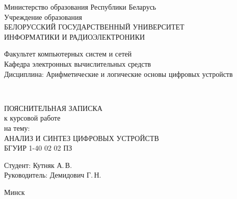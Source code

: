 \begin{titlepage}
    \begin{center}
      Министерство образования Республики Беларусь\\[1em]
      Учреждение образования\\
      БЕЛОРУССКИЙ ГОСУДАРСТВЕННЫЙ УНИВЕРСИТЕТ\\
      ИНФОРМАТИКИ И РАДИОЭЛЕКТРОНИКИ\\[2em]
  
      \begin{minipage}{\textwidth}
        \begin{flushleft}
          Факультет компьютерных систем и сетей\\[1em]
          Кафедра электронных вычислительных средств\\[1em]
          Дисциплина: Арифметические и логические основы цифровых устройств
        \end{flushleft}
      \end{minipage}\\[1em]
      
      \vfill

      {ПОЯСНИТЕЛЬНАЯ ЗАПИСКА}\\
      {к курсовой работе}\\
      {на тему:}\\[1em]
      АНАЛИЗ И СИНТЕЗ ЦИФРОВЫХ УСТРОЙСТВ\\[1em]

      {БГУИР 1-40 02 02 ПЗ}\\[2em]
      
      \vfill

      \hfill\parbox{0.5\textwidth}{\raggedright 
      {
          Студент: Кутняк А.\,В.\\
          \vspace{2em}  
          Руководитель: Демидович Г.\,Н.\\ 
      }}
      
      \vfill

      {\normalsize Минск \the\year}
    \end{center}
\end{titlepage}